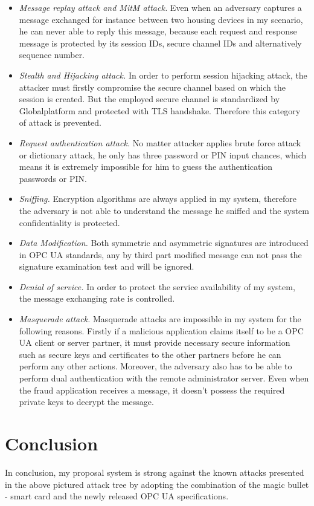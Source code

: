 \begin{itemize}
\item \emph{Message replay attack and MitM attack.} Even when an adversary captures a message  exchanged for instance between two housing devices in my scenario, he can never able to reply this message, because each request and response message is protected by its  session IDs, secure channel IDs and alternatively sequence number.
\item \emph{Stealth and Hijacking attack.} In order to perform session hijacking attack, the attacker must firstly compromise the secure channel based on which the session is created. But the employed secure  channel is standardized by Globalplatform and protected with TLS handshake. Therefore this category of attack is prevented.
\item \emph{Request authentication attack.} No matter attacker applies brute force attack or dictionary attack, he only has three password or PIN input chances, which means it is extremely impossible for him to guess the authentication passwords or PIN.
\item \emph{Sniffing.} Encryption algorithms are always  applied in my system, therefore the adversary is not  able to understand  the message he sniffed and the system confidentiality is protected.
\item \emph{Data Modification.} Both  symmetric and asymmetric  signatures are introduced in OPC UA standards, any by third part modified message can not pass the signature examination test and will be ignored.
\item \emph{Denial of service.} In order to protect  the service availability of my system, the message  exchanging rate is controlled. 
\item \emph{Masquerade attack.} Masquerade attacks are impossible in my system for the following reasons. Firstly if a malicious application claims itself to be a OPC UA client or server partner, it must provide necessary secure information such as secure keys and certificates to the other partners before he can perform any other actions. Moreover, the adversary also has to be able to perform dual authentication with the remote administrator server. Even when the fraud application receives a message, it doesn't possess the required  private keys to decrypt the message. 
\end{itemize}

\section{Conclusion}
In conclusion, my proposal system is strong against the known attacks presented in the above pictured attack tree by adopting the combination of the magic bullet - smart card and the newly released OPC UA specifications. 
